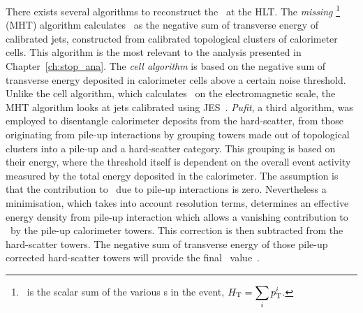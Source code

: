 					There exists several algorithms to reconstruct the \met\ at the \ac{HLT}. The \textit{missing} \HT\footnote{\HT\ is the scalar sum of the various \pt s in the event, $\displaystyle H_{\mathrm{T}} = \sum_{i} p_{\mathrm{T}}^i$.} (MHT) algorithm calculates \met\ as the negative sum of transverse energy of calibrated jets, constructed from calibrated topological clusters of calorimeter cells. This algorithm is the most relevant to the analysis presented in Chapter~\ref{ch:stop_ana}. The \textit{cell algorithm} is based on the negative sum of transverse energy deposited in calorimeter cells above a certain noise threshold. Unlike the cell algorithm, which calculates \met\ on the electromagnetic scale, the MHT algorithm looks at jets calibrated using \ac{JES}~\cite{ATL-PHYS-PUB-2015-015}. \textit{Pufit}, a third algorithm, was employed to disentangle calorimeter deposits from the hard-scatter, from those originating from pile-up interactions by grouping towers made out of topological clusters into a pile-up and a hard-scatter category. This grouping is based on their energy, where the threshold itself is dependent on the overall event activity measured by the total energy deposited in the calorimeter. The assumption is that the contribution to \met\ due to pile-up interactions is zero. Nevertheless a minimisation, which takes into account resolution terms, determines an effective energy density from pile-up interaction which allows a vanishing contribution to \met\ by the pile-up calorimeter towers. This correction is then subtracted from the hard-scatter towers. The negative sum of transverse energy of those pile-up corrected hard-scatter towers will provide the final \met\ value~\cite{ATL-COM-DAQ-2016-137}.

